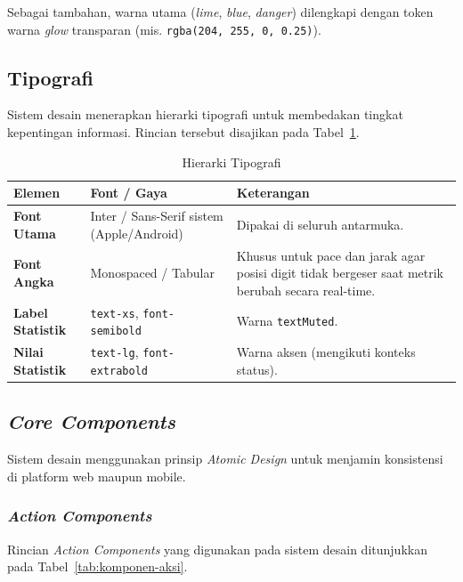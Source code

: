 Sebagai tambahan, warna utama (\textit{lime}, \textit{blue}, \textit{danger}) dilengkapi
dengan token warna \textit{glow} transparan (mis.
\texttt{rgba(204, 255, 0, 0.25)}).
\subsection{Tipografi}
\label{subsec:tipografi}
 
Sistem desain menerapkan hierarki tipografi untuk membedakan tingkat kepentingan informasi. Rincian tersebut disajikan pada Tabel~\ref{tab:tipografi}.
 
\begin{table}[htbp]
    \centering
    \small
    \caption{Hierarki Tipografi}
    \label{tab:tipografi}
    \begin{tabular}{|>{\bfseries}p{3cm}|p{4.3cm}|p{5.2cm}|}
        \hline
        \textbf{Elemen} & \textbf{Font / Gaya} & \textbf{Keterangan} \\
        \hline
        Font Utama & Inter / Sans-Serif sistem (Apple/Android) & Dipakai di seluruh antarmuka. \\
        \hline
        Font Angka & Monospaced / Tabular & Khusus untuk pace dan jarak agar posisi digit tidak bergeser saat metrik berubah secara real-time. \\
        \hline
        Label Statistik & \texttt{text-xs}, \texttt{font-semibold} & Warna \texttt{textMuted}. \\
        \hline
        Nilai Statistik & \texttt{text-lg}, \texttt{font-extrabold} & Warna aksen (mengikuti konteks status). \\
        \hline
    \end{tabular}
\end{table}
 
\subsection{\textit{Core Components}}
\label{subsec:komponen-inti}
 
Sistem desain menggunakan prinsip \textit{Atomic Design}  untuk menjamin konsistensi di platform web maupun
mobile.
 
\subsubsection{\textit{Action Components}}
\label{subsubsec:komponen-aksi}

Rincian \textit{Action Components} yang digunakan pada sistem desain ditunjukkan pada Tabel~\ref{tab:komponen-aksi}.
 
